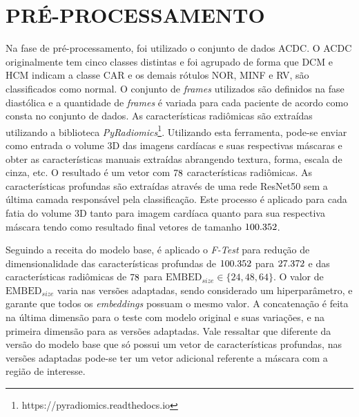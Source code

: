 
\section{PRÉ-PROCESSAMENTO}
\label{subsec:cap4_preprocess}

Na fase de pré-processamento, foi utilizado o conjunto de dados \gls{ACDC}. O \gls{ACDC} originalmente tem cinco classes distintas e foi agrupado de forma que DCM e HCM indicam a classe \gls{CAR} e os demais rótulos NOR, MINF e RV, são classificados como normal. O conjunto de \textit{frames} utilizados são definidos na fase diastólica e a quantidade de \textit{frames} é variada para cada paciente de acordo como consta no conjunto de dados. As características radiômicas são extraídas utilizando a biblioteca \textit{PyRadiomics}\footnote{https://pyradiomics.readthedocs.io}. Utilizando esta ferramenta, pode-se enviar como entrada o volume 3D das imagens cardíacas e suas respectivas máscaras e obter as características manuais extraídas abrangendo textura, forma, escala de cinza, etc. O resultado é um vetor com $78$ características radiômicas. As características profundas são extraídas através de uma rede ResNet50 sem a última camada responsável pela classificação. Este processo é aplicado para cada fatia do volume 3D tanto para imagem cardíaca quanto para sua respectiva máscara tendo como resultado final vetores de tamanho $100.352$. 

Seguindo a receita do modelo base, é aplicado o \textit{F-Test} para redução de dimensionalidade das características profundas de $100.352$ para $27.372$ e das características radiômicas de $78$ para $\text{EMBED}_{size} \in \{24, 48, 64\}$. O valor de $\text{EMBED}_{size}$ varia nas versões adaptadas, sendo considerado um hiperparâmetro, e garante que todos os \textit{embeddings} possuam o mesmo valor. A concatenação é feita na última dimensão para o teste com modelo original e suas variações, e na primeira dimensão para as versões adaptadas. Vale ressaltar que diferente da versão do modelo base que só possui um vetor de características profundas, nas versões adaptadas pode-se ter um vetor adicional referente a máscara com a região de interesse. 

